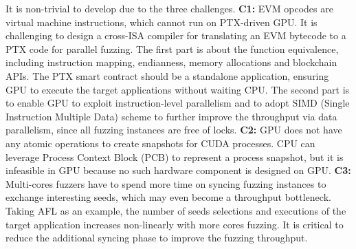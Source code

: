 It is non-trivial to develop {\tool} due to the three challenges. 
\textbf{C1:} 
EVM opcodes are virtual machine instructions, which cannot run on PTX-driven GPU. 
It is challenging to design a cross-ISA compiler for translating an EVM bytecode to a PTX code for parallel fuzzing. 
The first part is about the function equivalence, including instruction mapping, endianness, memory allocations and blockchain APIs. The PTX smart contract should be a standalone application, ensuring GPU to execute the target applications without waiting CPU. 
The second part is to enable GPU to exploit instruction-level parallelism and to adopt SIMD (Single Instruction Multiple Data) scheme to further improve the throughput via data parallelism\cite{falk2018vectorized, cuda2006datapara}, since all fuzzing instances are free of locks. 
%
%
\textbf{C2:} 
GPU does not have any atomic operations to create snapshots for CUDA processes. 
CPU can leverage Process Context Block (PCB) to represent a process snapshot, but it is infeasible in GPU because no such hardware component is designed on GPU.
%
\textbf{C3:} 
Multi-cores fuzzers have to spend more time on syncing fuzzing instances to exchange interesting seeds, which may even become a throughput bottleneck.
Taking AFL as an example, the number of seeds selections and executions of the target application increases non-linearly with more cores fuzzing\cite{xu2017designing}. 
It is critical to reduce the additional syncing phase to improve the fuzzing throughput.



